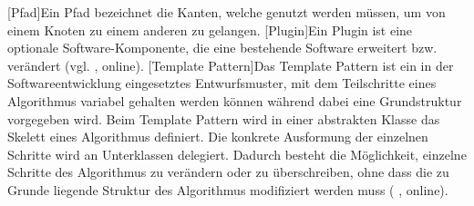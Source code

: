\begin{acronym}
    [Pfad]{Ein Pfad bezeichnet die Kanten, welche genutzt werden müssen, um von einem Knoten zu einem anderen zu gelangen.}
    [Plugin]{Ein Plugin ist eine optionale Software-Komponente, die eine bestehende Software erweitert bzw. verändert (vgl. \citeauthor{wikipedia_plug-_2019} \citeyear{wikipedia_plug-_2019}, online).}
    [Template Pattern]{Das Template Pattern ist ein in der Softwareentwicklung eingesetztes Entwurfsmuster, mit dem Teilschritte eines Algorithmus variabel gehalten werden können während dabei eine Grundstruktur vorgegeben wird. Beim Template Pattern wird in einer abstrakten Klasse das Skelett eines Algorithmus definiert. Die konkrete Ausformung der einzelnen Schritte wird an Unterklassen delegiert. Dadurch besteht die Möglichkeit, einzelne Schritte des Algorithmus zu verändern oder zu überschreiben, ohne dass die zu Grunde liegende Struktur des Algorithmus modifiziert werden muss (\citeauthor{wikipedia_schablonenmethode_2018} \citeyear{wikipedia_schablonenmethode_2018}, online).}
\end{acronym}
